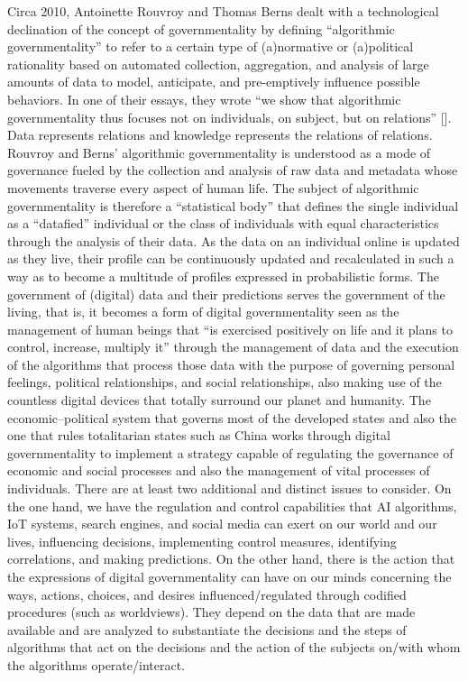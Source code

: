Circa 2010, Antoinette Rouvroy and Thomas Berns dealt with a technological declination of the concept of governmentality by defining ``algorithmic governmentality'' to refer to a certain type of (a)normative or (a)political rationality based on automated collection, aggregation, and analysis of large amounts of data to model, anticipate, and pre-emptively influence possible behaviors. In one of their essays, they wrote ``we show that algorithmic governmentality thus focuses not on individuals, on subject, but on relations'' [\citealt{chap:9:RouvroyandBerns:2013}]. Data represents relations and knowledge represents the relations of relations. Rouvroy and Berns' algorithmic governmentality is understood as a mode of governance fueled by the collection and analysis of raw data and metadata whose movements traverse every aspect of human life. The subject of algorithmic governmentality is therefore a ``statistical body'' that defines the single individual as a ``datafied'' individual or the class of individuals with equal characteristics through the analysis of their data. As the data on an individual online is updated as they live, their profile can be continuously updated and recalculated in such a way as to become a multitude of profiles expressed in probabilistic forms. The government of (digital) data and their predictions serves the government of the living, that is, it becomes a form of digital governmentality seen as the management of human beings that ``is exercised positively on life and it plans to control, increase, multiply it'' through the management of data and the execution of the algorithms that process those data with the purpose of governing personal feelings, political relationships, and social relationships, also making use of the countless digital devices that totally surround our planet and humanity. The economic--political system that governs most of the developed states and also the one that rules totalitarian states such as China works through digital governmentality to implement a strategy capable of regulating the governance of economic and social processes and also the management of vital processes of individuals. There are at least two additional and distinct issues to consider. On the one hand, we have the regulation and control capabilities that AI algorithms, IoT systems, search engines, and social media can exert on our world and our lives, influencing decisions, implementing control measures, identifying correlations, and making predictions. On the other hand, there is the action that the expressions of digital governmentality can have on our minds concerning the ways, actions, choices, and desires influenced/regulated through codified procedures (such as worldviews). They depend on the data that are made available and are analyzed to substantiate the decisions and the steps of algorithms that act on the decisions and the action of the subjects on/with whom the algorithms operate/{\allowbreak}interact.

